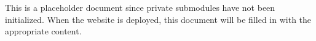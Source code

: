 \documentclass[12pt]{article}
\begin{document}
\pagestyle{empty}

\begin{center}

  This is a placeholder document since private submodules have not
  been initialized. When the website is deployed, this document will
  be filled in with the appropriate content.

\end{center}
\end{document}
